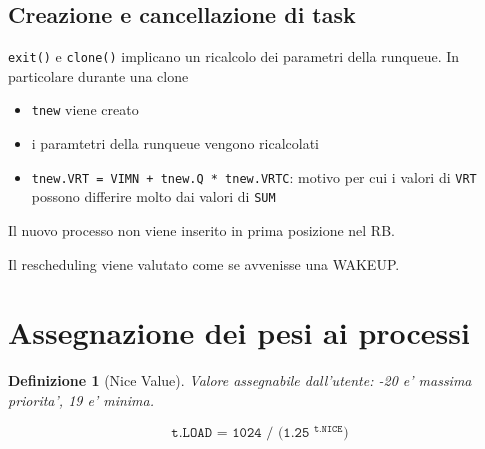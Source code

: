 \documentclass[12pt, a4paper]{report}
\newtheorem{definition}{Definizione}
\begin{document}
\subsection{Creazione e cancellazione di task}
\texttt{exit()} e \texttt{clone()} implicano un ricalcolo dei parametri della
runqueue. In particolare durante una clone
\begin{itemize}
	\item \texttt{tnew} viene creato
	\item i paramtetri della runqueue vengono ricalcolati
	\item \texttt{tnew.VRT = VIMN + tnew.Q * tnew.VRTC}: motivo per cui i valori
		di \texttt{VRT} possono differire molto dai valori di \texttt{SUM}
\end{itemize}
Il nuovo processo non viene inserito in prima posizione nel RB.

Il rescheduling viene valutato come se avvenisse una WAKEUP.

\section{Assegnazione dei pesi ai processi}
\begin{definition}[Nice Value]
	Valore assegnabile dall'utente: -20 e' massima priorita', 19 e' minima.
\end{definition}
\[
	\texttt{t.LOAD = 1024 / (1.25 $^{\texttt{t.NICE}}$)}
\]
\end{document}
